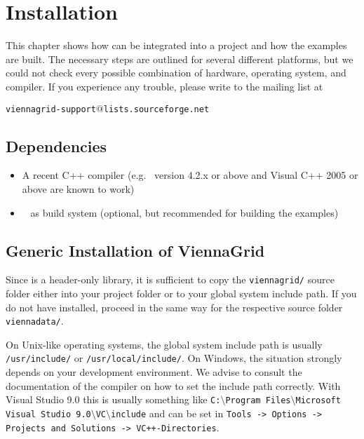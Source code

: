 \chapter{Installation}

This chapter shows how {\ViennaGrid} can be integrated into a project and how
the examples are built. The necessary steps are outlined for several different
platforms, but we could not check every possible combination of hardware,
operating system, and compiler. If you experience any trouble, please write to
the mailing list at \\
\begin{center}
\texttt{viennagrid-support$@$lists.sourceforge.net}
\end{center}


\section{Dependencies}
\label{dependencies}

\begin{itemize}
 \item A recent C++ compiler (e.g.~{\GCC} version 4.2.x or above and Visual C++
2005 or above are known to work)
 \item {\CMake}~\cite{cmake} as build system (optional, but recommended
for building the examples)
\end{itemize}


\section{Generic Installation of ViennaGrid} \label{sec:viennagrid-installation}
Since {\ViennaGrid} is a header-only library, it is sufficient to copy the
\lstinline|viennagrid/| source folder either into your project folder or to your global system
include path. If you do not have {\ViennaData} installed, proceed in the same way for the respective source folder \lstinline|viennadata/|.

On Unix-like operating systems, the global system include path is usually \lstinline|/usr/include/| or \lstinline|/usr/local/include/|.
On Windows, the situation strongly depends on your development environment. We
advise to consult the documentation of the compiler on how to set the include
path correctly. With Visual Studio 9.0 this is usually something like
\texttt{C:$\setminus$Program Files$\setminus$Microsoft Visual Studio
9.0$\setminus$VC$\setminus$include}
and can be set in \texttt{Tools -> Options -> Projects and Solutions ->
VC++-\-Directories}.



